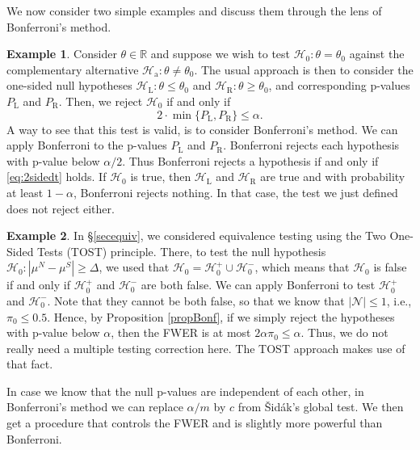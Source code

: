 \documentclass[11pt]{article}
\theoremstyle{plain}
\theoremstyle{definition}
\newtheorem{example}{Example}[section]
\newcommand{\reals}{\mathbb{R}}
\newcommand{\N}{\mathcal{N}}
\newcommand{\Hy}{\mathcal{H}}
\begin{document}
 We now consider two simple examples and discuss them through the lens of Bonferroni's method.
 
  \begin{example}
Consider $\theta\in \reals$ and suppose we wish to test $\Hy_0:\theta=\theta_0$ against the complementary alternative $\Hy_{\text{a}}:\theta\neq\theta_0$. The usual approach is then to consider the one-sided null hypotheses $\Hy_{\text{L}}: \theta\leq \theta_0$ and $\Hy_{\text{R}}: \theta\geq \theta_0$, and corresponding p-values $P_{\text{L}}$ and $P_{\text{R}}$. Then, we  reject $\Hy_0$ if and only if
\begin{equation} \label{eq:2sidedt}
2\cdot\min\{P_{\text{L}}, P_{\text{R}}\} \leq \alpha.
\end{equation}
 A way to see that this test is valid, is to consider Bonferroni's method. We can apply Bonferroni to the p-values $P_{\text{L}}$ and $P_{\text{R}}$. Bonferroni rejects each hypothesis with p-value below $\alpha/2$. Thus Bonferroni rejects a  hypothesis if and only if \eqref{eq:2sidedt} holds. If $\Hy_0$ is true, then $\Hy_{\text{L}}$ and $\Hy_{\text{R}}$ are true and with probability at least $1-\alpha$, Bonferroni rejects nothing. In that case, the test we just defined does not reject either.
 \end{example}
 
 
 
 \begin{example} \label{exampTOST}
 In \S\ref{secequiv}, we considered equivalence testing using the Two One-Sided Tests (TOST) principle. There, to test the null hypothesis $\Hy_0: |\mu^N-\mu^S|\geq \Delta$, we used that $\Hy_0 = \Hy_0^+\cup \Hy_0^-$, which means that $\Hy_0$ is false if and only if $\Hy_0^+$ and  $\Hy_0^-$ are both false.
We can apply Bonferroni to test $\Hy_0^+$ and  $\Hy_0^-$. Note that they cannot be both false, so that we know that $|\N|\leq 1$, i.e., $\pi_0\leq 0.5$. Hence, by Proposition \ref{propBonf}, if we simply reject the hypotheses with p-value below $\alpha$, then the FWER is at most $2\alpha\pi_0\leq \alpha$. Thus, we do not really need a multiple testing correction here. The TOST approach makes use of that fact.
 \end{example}
 
  In case we know that the null p-values  are independent of each other, in Bonferroni's method we can replace $\alpha/m$ by $c$ from \v{S}id\'{a}k's global test. We then get a procedure that controls the FWER and is slightly more powerful than Bonferroni.
 
\end{document}
